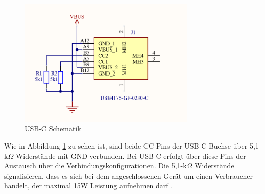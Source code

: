 \begin{inhalt}
\begin{figure}[!htb]
\centering
\includegraphics[width=0.75\textwidth]{files/Tobias/pics/Schaltungen/Schematik/USBC_Schematik.PNG}
\caption[USB-C Schematik]{USB-C Schematik}
\label{fig:USB-C_Schematik}
\end{figure}

Wie in Abbildung \ref{fig:USB-C_Schematik} zu sehen ist, sind beide CC-Pins der USB-C-Buchse über 5,1-k$\Omega$ Widerstände mit GND verbunden. Bei USB-C erfolgt über diese Pins der Austausch über die Verbindungskonfigurationen. Die 5,1-k$\Omega$ Widerstände signalisieren, dass es sich bei dem angeschlossenen Gerät um einen Verbraucher handelt, der maximal 15W Leistung aufnehmen darf \cite{USBCPowerDelivery}.

\begin{figure}[H] 
  \centering


\end{figure}
\end{inhalt}
